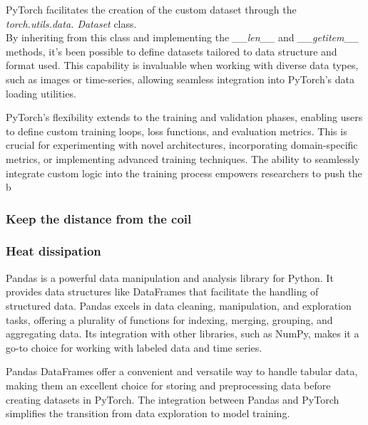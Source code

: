 PyTorch facilitates the creation of the custom dataset through the \textit{torch.utils.data. Dataset} class.\\ 
By inheriting from this class and implementing the \textit{\_\_len\_\_} and \textit{\_\_getitem\_\_} methods, it's been possible to define datasets tailored to data structure and format used. This capability is invaluable when working with diverse data types, such as images or time-series, allowing seamless integration into PyTorch's data loading utilities.

PyTorch's flexibility extends to the training and validation phases, enabling users to define custom training loops, loss functions, and evaluation metrics. This is crucial for experimenting with novel architectures, incorporating domain-specific metrics, or implementing advanced training techniques. The ability to seamlessly integrate custom logic into the training process empowers researchers to push the b
\subsubsection{Keep the distance from the coil}

\subsubsection{Heat dissipation}



Pandas is a powerful data manipulation and analysis library for Python. It provides data structures like DataFrames that facilitate the handling of structured data. Pandas excels in data cleaning, manipulation, and exploration tasks, offering a plurality of functions for indexing, merging, grouping, and aggregating data. Its integration with other libraries, such as NumPy, makes it a go-to choice for working with labeled data and time series.

Pandas DataFrames offer a convenient and versatile way to handle tabular data, making them an excellent choice for storing and preprocessing data before creating datasets in PyTorch. The integration between Pandas and PyTorch simplifies the transition from data exploration to model training.

